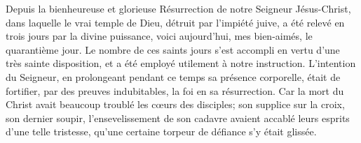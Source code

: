 Depuis la bienheureuse et glorieuse Résurrection de notre Seigneur Jésus-Christ,
	dans laquelle le vrai temple de Dieu, détruit par l’impiété juive,
	a été relevé en trois jours par la divine puissance,
	voici aujourd’hui, mes bien-aimés, le quarantième jour.
Le nombre de ces saints jours
	s’est accompli en vertu d’une très sainte disposition,
	et a été employé utilement à notre instruction.
L’intention du Seigneur, en prolongeant pendant ce temps sa présence corporelle,
	était de fortifier, par des preuves indubitables, la foi en sa résurrection.
Car la mort du Christ avait beaucoup troublé les cœurs des disciples;
	son supplice sur la croix, son dernier soupir,
	l’ensevelissement de son cadavre
	avaient accablé leurs esprits d’une telle tristesse,
	qu’une certaine torpeur de défiance s’y était glissée.

